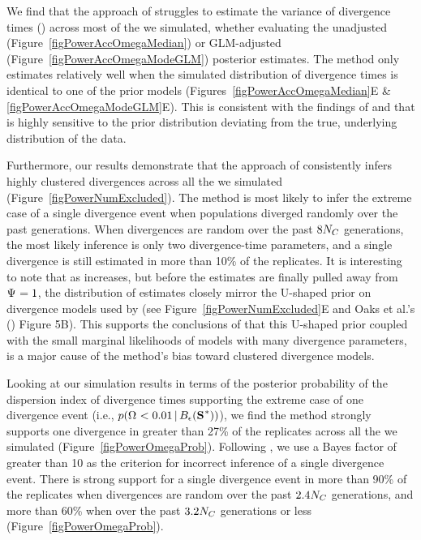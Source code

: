 \documentclass[letterpaper,12pt]{article}
\begin{document}
\begin{linenumbers}
We find that the approach of \citet{Hickerson2013} struggles to estimate the
variance of divergence times (\vmratio{}) across most of the 
we simulated, whether evaluating the unadjusted
(Figure~\ref{figPowerAccOmegaMedian}) or GLM-adjusted
(Figure~\ref{figPowerAccOmegaModeGLM}) posterior estimates.
The method only estimates \vmratio{} relatively well when the simulated
distribution of divergence times is identical to one of the prior models
(Figures~\ref{figPowerAccOmegaMedian}E \& \ref{figPowerAccOmegaModeGLM}E).
This is consistent with the findings of \citet{Oaks2012}  and
\citet{Hickerson2013} that \msb is highly sensitive to the prior distribution
deviating from the true, underlying distribution of the data.

Furthermore, our results demonstrate that the approach of \citet{Hickerson2013}
consistently infers highly clustered divergences across all the  we
simulated (Figure~\ref{figPowerNumExcluded}).
The method is most likely to infer the extreme case of a single divergence event
when populations diverged randomly over the past \globalcoalunit generations.
When divergences are random over the past $8N_C$ generations, the
most likely inference is only two divergence-time parameters, and a single
divergence is still estimated in more than 10\% of the replicates.
It is interesting to note that as  increases, but before the
estimates are finally pulled away from $\Psi_{} = 1$, the distribution of
\numt{} estimates closely mirror the U-shaped prior on divergence models
used by \msb (see Figure~\ref{figPowerNumExcluded}E and Oaks et al.'s
(\citeyear{Oaks2012}) Figure 5B).
This supports the conclusions of \citet{Oaks2012} that this U-shaped
prior coupled with the small marginal likelihoods of models with many
divergence parameters, is a major cause of the method's bias toward
clustered divergence models.

Looking at our simulation results in terms of the posterior probability of the
dispersion index of divergence times supporting the extreme case of one
divergence event (i.e., $p(\vmratio{} < 0.01 \given \ssSpace)$), we find the
method strongly supports one divergence in greater than 27\% of the replicates
across all the  we simulated (Figure~\ref{figPowerOmegaProb}).
Following \citet{Hickerson2013}, we use a Bayes factor of greater than 10 as
the criterion for incorrect inference of a single divergence event.
There is strong support for a single divergence event in more than 90\% of the
replicates when divergences are random over the past $2.4N_C$
generations, and more than 60\% when over the past $3.2N_C$
generations or less (Figure~\ref{figPowerOmegaProb}).


\end{linenumbers}
\end{document}
